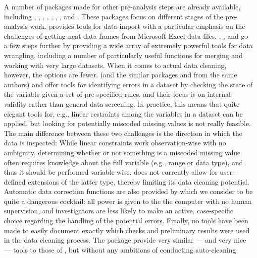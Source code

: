 \documentclass[article,shortnames]{jss}
\begin{document}
A number of  packages made for other pre-analysis steps
are already available, including  \citep{janitor},
 \citep{assertive},  \citep{dplyr},
\citep{tidyr},  \citep{data.table},
 \citep{DataCombine}, 
\citep{validate}, and  \citep{assertr}. These packages
focus on different stages of the pre-analysis work.  
provides tools for data import with a particular emphasis on the
challenges of getting neat data frames from Microsoft Excel data
files. , ,  and
 go a few steps further by providing a wide array of
extremely powerful tools for data wrangling, including a number of
particularly useful functions for merging and working with very large
datasets. When it comes to actual data cleaning, however, the options
are fewer.   (and the similar packages 
\citep{editrules} and  \citep{deducorrect} from the
same authors) and  offer tools for identifying errors
in a dataset by checking the state of the variable given a set of
pre-specified rules, and their focus is on internal validity rather
than general data screening. In practice, this means that quite elegant
tools for, e.g., linear restraints among the variables in a dataset
can be applied, but looking for potentially miscoded missing values is
not really feasible. The main difference between these two challenges
is the direction in which the data is inspected: While linear
constraints work observation-wise with no ambiguity, determining
whether or not something is a miscoded missing value often requires
knowledge about the full variable (e.g., range or data type), and thus
it should be performed variable-wise.  does not
currently allow for user-defined extensions of the latter type,
thereby limiting its data cleaning potential.  Automatic data
correction functions are also provided by  which we
consider to be quite a dangerous cocktail: all power is given to the
the computer with no human supervision, and investigators are less
likely to make an active, case-specific choice regarding the handling
of the potential errors.  Finally, no tools have been made to easily
document exactly which checks and preliminary results were used in the
data cleaning process. The  package provide very similar
--- and very nice --- tools to those of , but without
any ambitions of conducting auto-cleaning.
\end{document}
